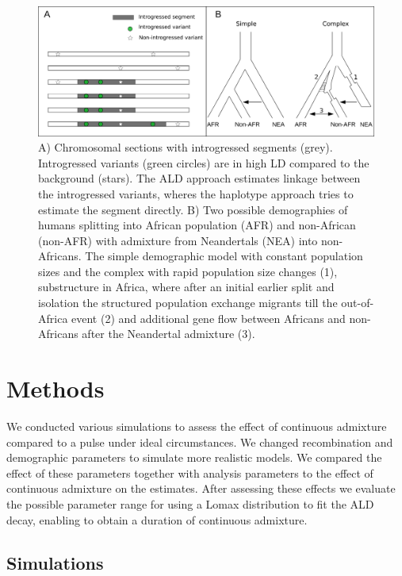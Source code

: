 \documentclass[]{article}
\begin{document}
\begin{figure}[H]

{\centering \includegraphics[width=0.95\linewidth]{Paper_Graphics_2} 

}

\caption{\label{fig:Into_fig} A) Chromosomal sections with introgressed segments (grey). Introgressed variants (green circles) are in high LD compared to the background (stars). The ALD approach estimates linkage between the introgressed variants, wheres the haplotype  approach tries to estimate the segment directly. B) Two possible demographies of humans splitting into African population (AFR) and non-African (non-AFR) with admixture from Neandertals (NEA) into non-Africans. The simple demographic model with constant population sizes and the complex with rapid population size changes (1), substructure in Africa, where after an initial earlier split and isolation the structured population exchange migrants till the out-of-Africa event (2) and additional gene flow between Africans and non-Africans after the Neandertal admixture (3).}\label{fig:Intro_fig}
\end{figure}

\section{Methods}\label{methods}

We conducted various simulations to assess the effect of continuous
admixture compared to a pulse under ideal circumstances. We changed
recombination and demographic parameters to simulate more realistic
models. We compared the effect of these parameters together with
analysis parameters to the effect of continuous admixture on the
estimates. After assessing these effects we evaluate the possible
parameter range for using a Lomax distribution to fit the ALD decay,
enabling to obtain a duration of continuous admixture.

\subsection{Simulations}\label{simulations}
\end{document}
